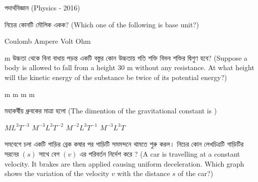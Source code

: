\documentclass[addpoints]{exam}
\begin{document}
\begin{LARGE}
\begin{center}
পদার্থবিজ্ঞান (Physics - 2016)
\end{center}
\end{LARGE}
\begin{questions}

\question নিচের কোনটি মৌলিক একক? (Which one of the following is base unit?)

\begin{oneparchoices}
\choice Coulomb
\choice Ampere
\choice Volt
\choice Ohm
\end{oneparchoices}

  m উচ্চতা থেকে বিনা বাধায় পড়ন্ত একটি বস্তুর কোন উচ্চতায় গতি শক্তি বিভব শক্তির দ্বিগুণ হবে? (Suppose a body is allowed to fall from a height 30 m without any resistance. At what height will the kinetic energy of the substance be twice of its potential energy?)

\begin{oneparchoices}
 m
 m
 m
 m

\end{oneparchoices}

\question মহাকর্ষীয় ধ্রুবকের মাত্রা হলো (The dimention of the gravitational constant is )

\begin{oneparchoices}
\choice $ ML^{3}T^{-3} $
\choice  $ M^{-3}L^{3}T^{-2} $
\choice  $ M^{-2}L^{3}T^{-1} $
\choice  $ M^{-3}L^{3}T $
\end{oneparchoices}

\question  সমবেগে চলা একটি গাড়ির ব্রেক কষার পর গাড়িটি সমমন্দনে থামতে শুরু করল। নিচের কোন লেখচিত্রটি গাড়িটির সরনের $ (s) $ সাথে বেগ $ (v) $ এর পরিবর্তন নির্দেশ করে ? (A car is travelling at a constant velocity. It brakes are then applied causing uniform deceleration. Which graph shows the variation of the velocity $ v $ with the distance $ s $ of the car?)


\end{questions}
\end{document}
